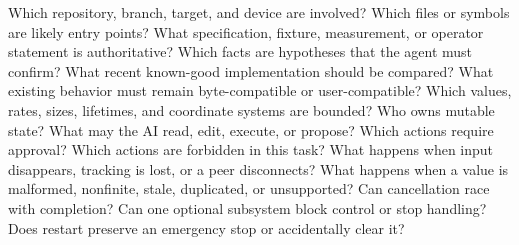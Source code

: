 \markdownRendererUlEnd \markdownRendererInterblockSeparator
{}
\markdownRendererSectionEnd \markdownRendererSectionBegin
{}\markdownRendererInterblockSeparator
{}\markdownRendererUlBegin
\markdownRendererUlItem Which repository, branch, target, and device are involved?\markdownRendererUlItemEnd 
\markdownRendererUlItem Which files or symbols are likely entry points?\markdownRendererUlItemEnd 
\markdownRendererUlItem What specification, fixture, measurement, or operator statement is authoritative?\markdownRendererUlItemEnd 
\markdownRendererUlItem Which facts are hypotheses that the agent must confirm?\markdownRendererUlItemEnd 
\markdownRendererUlItem What recent known-good implementation should be compared?\markdownRendererUlItemEnd 
\markdownRendererUlEnd \markdownRendererInterblockSeparator
{}
\markdownRendererSectionEnd \markdownRendererSectionBegin
{}\markdownRendererInterblockSeparator
{}\markdownRendererUlBegin
\markdownRendererUlItem What existing behavior must remain byte-compatible or user-compatible?\markdownRendererUlItemEnd 
\markdownRendererUlItem Which values, rates, sizes, lifetimes, and coordinate systems are bounded?\markdownRendererUlItemEnd 
\markdownRendererUlItem Who owns mutable state?\markdownRendererUlItemEnd 
\markdownRendererUlItem What may the AI read, edit, execute, or propose?\markdownRendererUlItemEnd 
\markdownRendererUlItem Which actions require approval?\markdownRendererUlItemEnd 
\markdownRendererUlItem Which actions are forbidden in this task?\markdownRendererUlItemEnd 
\markdownRendererUlEnd \markdownRendererInterblockSeparator
{}
\markdownRendererSectionEnd \markdownRendererSectionBegin
{}\markdownRendererInterblockSeparator
{}\markdownRendererUlBegin
\markdownRendererUlItem What happens when input disappears, tracking is lost, or a peer disconnects?\markdownRendererUlItemEnd 
\markdownRendererUlItem What happens when a value is malformed, nonfinite, stale, duplicated, or unsupported?\markdownRendererUlItemEnd 
\markdownRendererUlItem Can cancellation race with completion?\markdownRendererUlItemEnd 
\markdownRendererUlItem Can one optional subsystem block control or stop handling?\markdownRendererUlItemEnd 
\markdownRendererUlItem Does restart preserve an emergency stop or accidentally clear it?\markdownRendererUlItemEnd 
\markdownRendererUlEnd \markdownRendererInterblockSeparator
{}
\markdownRendererSectionEnd \markdownRendererSectionBegin
{}\markdownRendererInterblockSeparator

